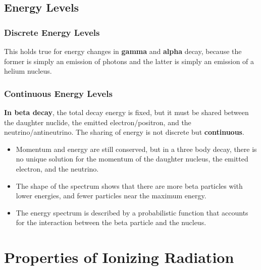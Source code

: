 \documentclass[a4paper,12pt]{article}
\let\oldsection\section
\renewcommand\section{\clearpage\oldsection}
\begin{document}
\subsection{Energy Levels}

\subsubsection{Discrete Energy Levels}

This holds true for energy changes in \textbf{gamma} and \textbf{alpha} decay, because the former is simply an emission of photons and the latter is simply an emission of a helium nucleus.

\subsubsection{Continuous Energy Levels}

\textbf{In beta decay}, the total decay energy is fixed, but it must be shared between the daughter nuclide, the emitted electron/positron, and the neutrino/antineutrino. The sharing of energy is not discrete but \textbf{continuous}.
\begin{itemize}
  \item Momentum and energy are still conserved, but in a three body decay, there is no unique solution for the momentum of the daughter nucleus, the emitted electron, and the neutrino.
  \item The shape of the spectrum shows that there are more beta particles with lower energies, and fewer particles near the maximum energy.
  \item The energy spectrum is described by a probabilistic function that accounts for the interaction between the beta particle and the nucleus.
\end{itemize}

\section{Properties of Ionizing Radiation}
\end{document}
